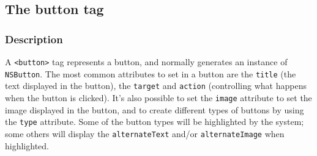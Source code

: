 %
%

%
%
%
%
%
%
%

\subsection{The button tag}

\subsubsection{Description}
A \texttt{<button>} tag represents a button, and normally generates an
instance of \texttt{NSButton}.  The most common attributes to set in a
button are the \texttt{title} (the text displayed in the button), the
\texttt{target} and \texttt{action} (controlling what happens when the
button is clicked).  It's also possible to set the \texttt{image}
attribute to set the image displayed in the button, and to create
different types of buttons by using the \texttt{type} attribute.  Some
of the button types will be highlighted by the system; some others
will display the \texttt{alternateText} and/or \texttt{alternateImage}
when highlighted.

